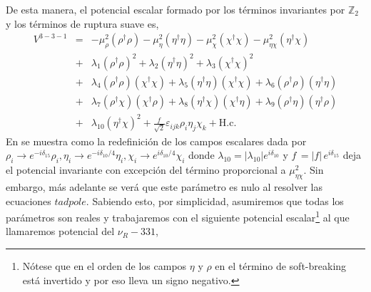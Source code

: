 De esta manera, el potencial escalar formado por los términos invariantes por $\mathbb{Z}_2$ y los términos de ruptura suave es, 
\begin{eqnarray}
V^{3-3-1} &=& -\mu_\rho^2 \left( \rho^{\dagger}\rho \right) -\mu_\eta^2 \left( \eta^{\dagger}\eta \right) -\mu_\chi^2 \left( \chi^{\dagger}\chi \right) - \mu_{\eta\chi}^2 \left( \eta^{\dagger} \chi \right)\nonumber \\
&+& \lambda_1 \left( \rho^{\dagger}\rho \right)^2 + \lambda_2 \left( \eta^{\dagger}\eta \right)^2 + \lambda_3 \left( \chi^{\dagger}\chi \right)^2 \nonumber \\
&+& \lambda_4 \left( \rho^{\dagger}\rho \right) \left( \chi^{\dagger}\chi \right) + \lambda_5 \left( \eta^{\dagger}\eta \right) \left( \chi^{\dagger}\chi \right) + \lambda_6 \left( \rho^{\dagger}\rho \right) \left( \eta^{\dagger}\eta \right) \nonumber \\
&+& \lambda_7 \left( \rho^{\dagger}\chi \right) \left( \chi^{\dagger}\rho \right) + \lambda_8 \left( \eta^{\dagger}\chi \right) \left( \chi^{\dagger}\eta \right) + \lambda_9 \left( \rho^{\dagger}\eta \right) \left( \eta^{\dagger}\rho \right) \nonumber \\
&+& \lambda_{10} \left( \eta^{\dagger}\chi \right)^2 + \frac{f \,}{\sqrt{2}} \varepsilon_{ijk} \rho_i \eta_j \chi_k + \text{H.c}.
\label{preV331Ec}
\end{eqnarray}
En \cite{sanchez2019vacuum} se muestra como la redefinición de los campos escalares dada por $\rho_i\to e^{-i\delta_{15}} \rho_i,\eta_i\to e^{-i\delta_{10}/4} \eta_i, \chi_i\to e^{i\delta_{10}/4} \chi_i$ donde $\lambda_{10} = |\lambda_{10}|e^{i\delta_{10}}$ y $f \, = |f| \,e^{i\delta_{15}}$ deja el potencial invariante con excepción del término proporcional a $\mu_{\eta \chi}^2$. Sin embargo, más adelante se verá que este parámetro es nulo al resolver las ecuaciones $tadpole$. Sabiendo esto, por simplicidad, asumiremos que todas los parámetros son reales y trabajaremos con el siguiente potencial escalar\footnote{Nótese que en \cite{sanchez2019vacuum} el orden de los campos $\eta$ y $\rho$ en el término de soft-breaking está invertido y por eso lleva un signo negativo.} al que llamaremos potencial del $\nu_R-331$,

